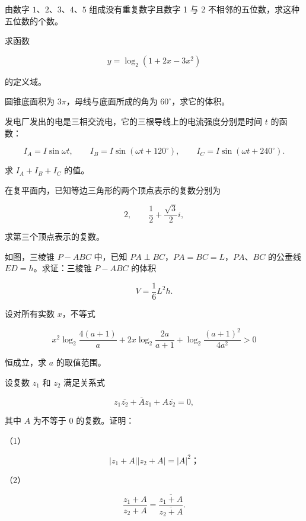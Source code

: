 \begin{question}
由数字 $1\text{、}2\text{、}3\text{、}4\text{、}5$ 组成没有重复数字且数字 1 与 2 不相邻的五位数，求这种五位数的个数。

\end{question}
\begin{question}
求函数

\nopagebreak[4]
\[
y=\log_2(1+2x-3x^2)
\]

的定义域。

\end{question}
\begin{question}
圆锥底面积为 $3\pi$，母线与底面所成的角为 $60^\circ$，求它的体积。

\end{question}
\begin{question}
发电厂发出的电是三相交流电，它的三根导线上的电流强度分别是时间 $t$ 的函数：

\nopagebreak[4]
\[
I_A=I\sin\omega t,\qquad
I_B=I\sin(\omega t+120^\circ),\qquad
I_C=I\sin(\omega t+240^\circ).
\]

求 $I_A+I_B+I_C$ 的值。

\end{question}
\begin{question}
在复平面内，已知等边三角形的两个顶点表示的复数分别为

\nopagebreak[4]
\[
2,\qquad \frac12+\frac{\sqrt3}{2}i,
\]

求第三个顶点表示的复数。

\Needspace{0.4\textheight}
\end{question}
\begin{question}
如图，三棱锥 $P-ABC$ 中，已知 $PA\perp BC$，$PA=BC=L$，$PA\text{、}BC$ 的公垂线 $ED=h$。求证：三棱锥 $P-ABC$ 的体积

\nopagebreak[4]
\[
V=\frac16L^2h.
\]
\nopagebreak[4]
\begin{center}\end{center}
\nopagebreak[4]
\end{question}
\begin{question}
设对所有实数 $x$，不等式

\nopagebreak[4]
\[
x^2\log_2\frac{4(a+1)}a
+2x\log_2\frac{2a}{a+1}
+\log_2\frac{(a+1)^2}{4a^2}>0
\]

恒成立，求 $a$ 的取值范围。

\end{question}
\begin{question}
设复数 $z_1$ 和 $z_2$ 满足关系式

\nopagebreak[4]
\[
z_1\overline{z_2}+\overline A z_1+A\overline{z_2}=0,
\]

其中 $A$ 为不等于 0 的复数。证明：

（1）　

\nopagebreak[4]
\[
|z_1+A||z_2+A|=|A|^2\text{；}
\]

（2）　

\nopagebreak[4]
\[
\frac{z_1+A}{z_2+A}
=\frac{\overline{z_1+A}}{\overline{z_2+A}}.
\]

\end{question}
